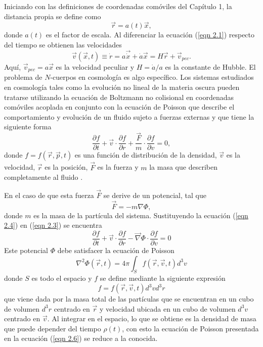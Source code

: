 \documentclass[a4paper,openright,10pt, oneside, final]{book}
\begin{document}
Iniciando con las definiciones de coordenadas comóviles del Capítulo 1, la distancia propia se define como  
\begin{equation}
\vec{r} = a(t)\vec{x},\label{eqn 2.1}
\end{equation}
donde $a(t)$ es el factor de escala. Al diferenciar la ecuación (\ref{eqn 2.1}) respecto del tiempo se obtienen las velocidades
\begin{equation}
\vec{v}(\vec{x},t)\equiv\dot{r}=a\vec{\dot{x}}+\dot{a}\vec{x}
=H\vec{r}+\vec{v}_{pec}.\label{eqn 2.2}
\end{equation}
Aquí, $\vec{v}_{pec}=a\vec{x}$ es la velocidad peculiar y $H=\dot{a}/a$ es la constante de Hubble. El problema de $N$-cuerpos en cosmología es algo específico.  Los sistemas estudiados en cosmología tales como la evolución no lineal de la materia oscura pueden tratarse utilizando la ecuación de Boltzmann no colisional en coordenadas comóviles acoplada en conjunto con la ecuación de Poisson que describe el comportamiento y evolución de un fluido sujeto a fuerzas externas y que tiene la siguiente forma 
\begin{equation}
\frac{\partial f}{\partial t} + \vec{v}\cdot\frac{\partial f}{\partial r} + \frac{\vec{F}}{m}\cdot\frac{\partial f}{\partial v}=0,\label{eqn 2.3}
\end{equation}
donde $f= f(\vec{r}, \vec{p}, t)$ es una función de distribución de la densidad, $\vec{v}$ es la velocidad, $\vec{r}$ es la posición, $\vec{F}$ es la fuerza y $m$ la masa que describen completamente al fluido \cite{b3}.

En el caso de que esta fuerza $\vec{F}$ se derive de un potencial, tal que 
\begin{equation}
\vec{F} = -m\nabla\Phi,\label{eqn 2.4}
\end{equation}
donde $m$ es la masa de la partícula del sistema. Sustituyendo la ecuación (\ref{eqn 2.4}) en (\ref{eqn 2.3}) se encuentra
\begin{equation}
\frac{\partial f}{\partial t} + \vec{v}\cdot\frac{\partial f}{\partial r} - \vec\nabla\Phi\cdot\frac{\partial f}{\partial v}=0\label{eqn 2.5}
\end{equation} 
Este potencial $\Phi$ debe satisfacer la ecuación de Poisson
\begin{equation}
\nabla^{2} \Phi (\vec{r},t) = 4\pi \int_{S} f(\vec{r},\vec{v},t)d^{3}v\label{eqn 2.6}
\end{equation}
donde $S$ es todo el espacio y $f$ se define mediante la siguiente expresión
\begin{equation}
f = f(\vec{r},\vec{v},t)d^{3}v d^{3}r\label{eqn 2.7}
\end{equation}
que viene dada por la masa total de las partículas que se encuentran en un cubo de volumen $d^{3}r$ centrado en $\vec{r}$ y velocidad ubicada en un cubo de volumen $d^{3}v$ centrado en $\vec{v}$. Al integrar en el espacio, lo que se obtiene es la densidad de masa que puede depender del tiempo $\rho(t)$, con esto la ecuación de Poisson presentada en la ecuación (\ref{eqn 2.6}) se reduce a la conocida.
\end{document}
